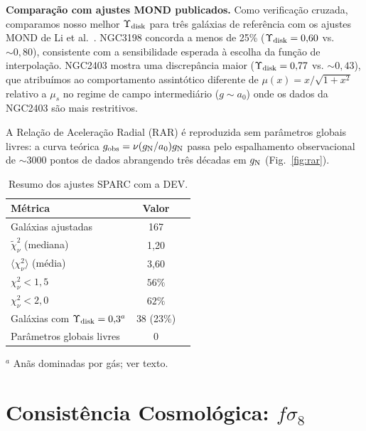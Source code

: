 \documentclass[aps,prd,twocolumn,showpacs,superscriptaddress]{revtex4-2}
\newcommand{\aO}{a_0}
\newcommand{\gN}{g_{\rm N}}
\newcommand{\gobs}{g_{\rm obs}}
\begin{document}
\textbf{Comparação com ajustes MOND publicados.}
Como verificação cruzada, comparamos nosso melhor $\Upsilon_{\rm disk}$
para três galáxias de referência com os ajustes MOND de
Li et al.~\cite{Li2018}.
NGC3198 concorda a menos de 25\% ($\Upsilon_{\rm disk} = 0{,}60$
vs. $\sim\!0{,}80$), consistente com a sensibilidade esperada à
escolha da função de interpolação.
NGC2403 mostra uma discrepância maior ($\Upsilon_{\rm disk} = 0{,}77$
vs. $\sim\!0{,}43$), que atribuímos ao comportamento assintótico
diferente de $\mu(x) = x/\sqrt{1+x^2}$ relativo a $\mu_s$ no
regime de campo intermediário ($g \sim \aO$) onde os dados da
NGC2403 são mais restritivos.

A Relação de Aceleração Radial (RAR) é reproduzida sem parâmetros
globais livres: a curva teórica $\gobs = \nu(\gN/\aO)\gN$ passa
pelo espalhamento observacional de $\sim 3000$ pontos de dados
abrangendo três décadas em $\gN$ (Fig.~\ref{fig:rar}).

\begin{table}[h]
\caption{Resumo dos ajustes SPARC com a DEV.}
\label{tab:sparc}
\begin{ruledtabular}
\begin{tabular}{lcc}
Métrica & Valor \\
\hline
Galáxias ajustadas                         & 167  \\
$\widetilde\chi^2_\nu$ (mediana)           & 1,20 \\
$\langle\chi^2_\nu\rangle$ (média)         & 3,60 \\
$\chi^2_\nu < 1{,}5$                       & $56\%$ \\
$\chi^2_\nu < 2{,}0$                       & $62\%$ \\
Galáxias com $\Upsilon_{\rm disk}=0{,}3^a$ & 38 (23\%) \\
Parâmetros globais livres                  & 0 \\
\end{tabular}
\end{ruledtabular}
{\small $^a$ Anãs dominadas por gás; ver texto.}
\end{table}

\section{Consistência Cosmológica: \texorpdfstring{$f\sigma_8$}{fsigma8}}
\label{sec:cosmo}
\end{document}
